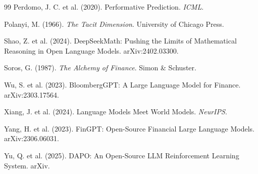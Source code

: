 \documentclass[11pt,a4paper]{article}
\begin{document}
\begin{thebibliography}{99}
Perdomo, J. C. et al. (2020).
Performative Prediction.
\textit{ICML}.

Polanyi, M. (1966).
\textit{The Tacit Dimension}. University of Chicago Press.

Shao, Z. et al. (2024).
DeepSeekMath: Pushing the Limits of Mathematical Reasoning in Open Language Models.
arXiv:2402.03300.

Soros, G. (1987).
\textit{The Alchemy of Finance}. Simon \& Schuster.

Wu, S. et al. (2023).
BloombergGPT: A Large Language Model for Finance.
arXiv:2303.17564.

Xiang, J. et al. (2024).
Language Models Meet World Models.
\textit{NeurIPS}.

Yang, H. et al. (2023).
FinGPT: Open-Source Financial Large Language Models.
arXiv:2306.06031.

Yu, Q. et al. (2025).
DAPO: An Open-Source LLM Reinforcement Learning System.
arXiv.

\end{thebibliography}
\end{document}
